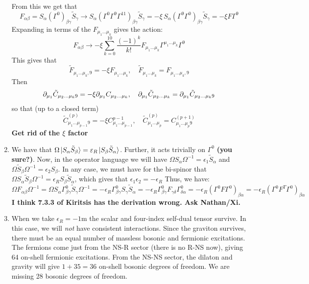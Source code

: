 \documentclass[11pt, class=article, crop=false]{standalone}
\begin{document}
\begin{enumerate}
	From this we get that 
	\[
		F_{\alpha \beta} = S_{\alpha} (\Gamma^{0})_{\beta \gamma} \tilde S_\gamma \to S_{\alpha} (\Gamma^{0} \Gamma^{9} \Gamma^{11})_{\beta \gamma} \tilde S_\gamma = - \xi \, S_{\alpha} (\Gamma^{9} \Gamma^{0})_{\beta \gamma} \tilde S_\gamma = - \xi F \Gamma^{9}
	\]
	Expanding in terms of the $F_{\mu_1 \dots \mu_k}$ gives the action:
	\[
		F_{\alpha \beta} \to - \xi \sum_{k=0}^{10} \frac{(-1)^k}{k!} F_{\mu_1 \dots \mu_k} \Gamma^{\mu_1 \dots \mu_k} \Gamma^{9}
	\]
	This gives that
	\[
		\tilde F_{\mu_1 \dots \mu_k, 9} = - \xi F_{\mu_1 \dots \mu_k}, \quad \tilde F_{\mu_1 \dots \mu_k} = F_{\mu_1 \dots \mu_k, 9}
	\]
	Then
	\[
		\partial_{\mu_1} \tilde C_{\mu_2 \dots \mu_k 9} = -\xi \partial_{\mu_1} C_{\mu_2 \dots \mu_k}, \quad \partial_{\mu_1} \tilde C_{\mu_2 \dots \mu_k} = \partial_{\mu_1} \tilde C_{\mu_2 \dots \mu_k 9}
	\]
	so that (up to a closed term)
	\[
		\tilde C_{\mu_1 \dots \mu_{p-1} 9}^{(p)} = -\xi C_{\mu_1 \dots \mu_{p-1}}^{p-1}, \quad \tilde C^{(p)}_{\mu_1 \dots \mu_p} = C^{(p+1)}_{\mu_1 \dots \mu_p 9}
	\]
	\textbf{Get rid of the $\xi$ factor}
	
	\item We have that $\Omega \ket{S_\alpha \tilde S_\beta} = \varepsilon_R \ket{S_\beta \tilde S_\alpha}$. Further, it acts trivially on $\Gamma^0$ \textbf{(you sure?)}. Now, in the operator language we will have $\Omega S_\alpha \Omega^{-1} = \epsilon_1 \tilde S_\alpha$ and $\Omega \tilde S_\beta \Omega^{-1} = \epsilon_2 S_\beta$. In any case, we must have for the bi-spinor that $\Omega S_\alpha \tilde S_\beta \Omega^{-1} = \epsilon_R S_\beta \tilde S_\alpha$, which gives that $\epsilon_1 \epsilon_2 = -\epsilon_R$ Thus, we have:
	\[
		\Omega F_{\alpha \beta} \Omega^{-1} = \Omega S_\alpha \Gamma^0_{\beta \gamma} \tilde S_\gamma \Omega^{-1} = - \epsilon_R \Gamma^0_{\beta \gamma} S_{\gamma} \tilde S_\alpha = - \epsilon_R \Gamma^0_{\beta \gamma} F_{\gamma \delta} \Gamma^0_{\delta \alpha} = -\epsilon_R (\Gamma^0 F \Gamma^0)_{\beta \alpha} =  -\epsilon_R (\Gamma^0 F^T \Gamma^0)_{\beta \alpha }
	\]
	\textbf{I think 7.3.3 of Kiritsis has the derivation wrong. Ask Nathan/Xi.}
	\item When we take $\epsilon_R = -1$m the scalar and four-index self-dual tensor survive. In this case, we will \emph{not} have consistent interactions. Since the graviton survives, there must be an equal number of massless bosonic and fermionic excitations. The fermions come just from the NS-R sector (there is no R-NS now), giving 64 on-shell fermionic excitations. From the NS-NS sector, the dilaton and gravity will give $1+35 = 36$ on-shell bosonic degrees of freedom. We are missing 28 bosonic degrees of freedom. 
	

\end{enumerate}
\end{document}
